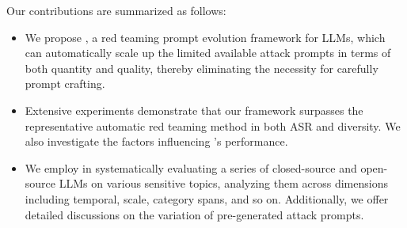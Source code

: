 Our contributions are summarized as follows:
\begin{itemize}
    \item We propose \modelname, a red teaming prompt evolution framework for LLMs, which can automatically scale up the limited available attack prompts in terms of both quantity and quality, thereby eliminating the necessity for carefully prompt crafting.

   \item Extensive experiments demonstrate that our \modelname framework surpasses the representative automatic red teaming method in both ASR and diversity.
   We also investigate the factors influencing \modelname's performance. 
   
   
    \item We employ \modelname in systematically evaluating a series of closed-source and open-source LLMs on various sensitive topics, analyzing them across dimensions including temporal, scale, category spans, and so on. Additionally, we offer detailed discussions on the variation of pre-generated attack prompts.
\end{itemize}
